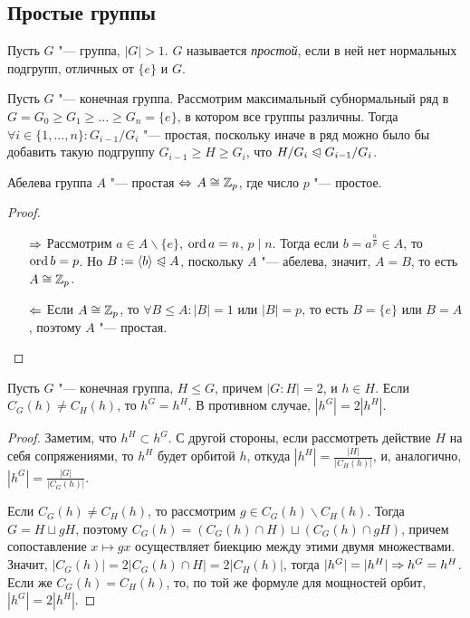 \subsection{Простые группы}

\begin{definition}
	Пусть $G$ "--- группа, $|G| > 1$. $G$ называется \textit{простой}, если в ней нет нормальных подгрупп, отличных от $\{e\}$ и $G$.
\end{definition}

\begin{note}
	Пусть $G$ "--- конечная группа. Рассмотрим максимальный субнормальный ряд в $G = G_0 \ge G_1 \ge \dots \ge G_n = \{e\}$, в котором все группы различны. Тогда $\forall i \in \{1, \dotsc, n\}: G_{i-1}/G_i$ "--- простая, поскольку иначе в ряд можно было бы добавить такую подгруппу $G_{i-1} \ge H \ge G_i$, что $H/ G_i \trianglelefteqslant G_{i-1} / G_i$.
\end{note}

\begin{proposition}
	Абелева группа $A$ "--- простая $\Leftrightarrow$ $A \cong \mathbb{Z}_p$, где число $p$ "--- простое.
\end{proposition}

\begin{proof}~
	\begin{itemize}
		\item[$\Rightarrow$] Рассмотрим $a \in A \backslash \{e\}$, $\operatorname{ord}{a} = n$, $p\mid n$. Тогда если $b = a^{\frac np} \in A$, то $\operatorname{ord}{b} = p$. Но $B := \langle b \rangle \trianglelefteqslant A$, поскольку $A$ "--- абелева, значит, $A = B$, то есть $A \cong \mathbb{Z}_p$.
		\item[$\Leftarrow$] Если $A \cong \mathbb{Z}_p$, то $\forall B \le A: |B| = 1$ или $|B| = p$, то есть $B = \{e\}$ или $B = A$, поэтому $A$ "--- простая.
	\end{itemize}
\end{proof}

\begin{proposition}
	Пусть $G$ "--- конечная группа, $H \le G$, причем $|G : H| = 2$, и $h \in H$. Если $C_G(h) \ne C_H(h)$, то $h^G = h^H$. В противном случае, $|h^G| = 2|h^H|$.
\end{proposition}

\begin{proof}
	Заметим, что $h^H \subset h^G$. С другой стороны, если рассмотреть действие $H$ на себя сопряжениями, то $h^H$ будет орбитой $h$, откуда $|h^H| = \frac{|H|}{|C_H(h)|}$, и, аналогично, $|h^G| = \frac{|G|}{|C_G(h)|}$.
	
	Если $C_G(h) \ne C_H(h)$, то рассмотрим $g \in C_G(h) \backslash C_H(h)$. Тогда $G = H \sqcup gH$, поэтому $C_G(h) = (C_G(h) \cap H) \sqcup (C_G(h) \cap gH)$, причем сопоставление $x \mapsto gx$ осуществляет биекцию между этими двумя множествами. Значит, $|C_G(h)| = 2|C_G(h) \cap H|= 2|C_H(h)|$, тогда $|h^G| \hm= |h^H| \ra h^G \hm= h^H$. Если же $C_G(h) = C_H(h)$, то, по той же формуле для мощностей орбит, $|h^G| = 2|h^H|$.
\end{proof}


